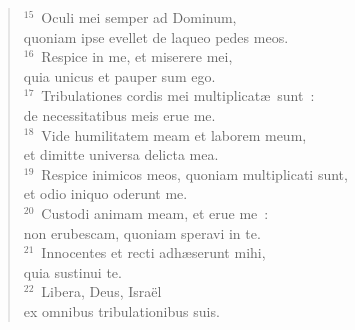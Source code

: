 \begin{flushleft}
\begin{verse}
${}^{15}$~Oculi mei semper ad Dominum,\\ quoniam ipse evellet de laqueo pedes meos.\\
${}^{16}$~Respice in me, et miserere mei,\\ quia unicus et pauper sum ego.\\
${}^{17}$~Tribulationes cordis mei multiplicat\ae\ sunt~:\\ de necessitatibus meis erue me.\\
${}^{18}$~Vide humilitatem meam et laborem meum,\\ et dimitte universa delicta mea.\\
${}^{19}$~Respice inimicos meos, quoniam multiplicati sunt,\\ et odio iniquo oderunt me.\\
${}^{20}$~Custodi animam meam, et erue me~:\\ non erubescam, quoniam speravi in te.\\
${}^{21}$~Innocentes et recti adh\ae serunt mihi,\\ quia sustinui te.\\
${}^{22}$~Libera, Deus, Isra\"el\\ ex omnibus tribulationibus suis.\end{verse}\end{flushleft}



